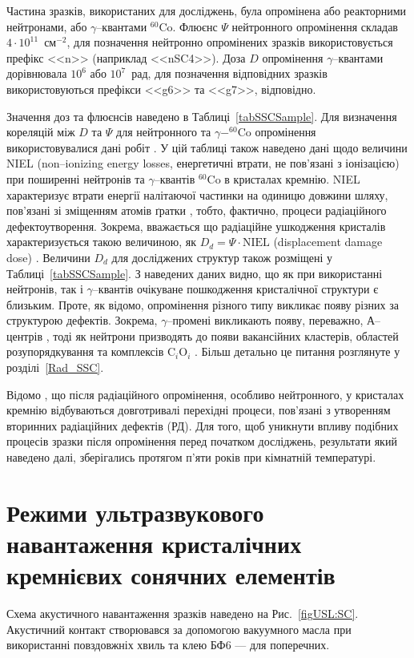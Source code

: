 Частина зразків, використаних для досліджень, була опромінена або реакторними нейтронами, або $\gamma$--квантами $^{60}$Co.
Флюєнс $\Psi$ нейтронного опромінення складав $4\cdot10^{11}$~см$^{-2}$,
для позначення нейтронно опромінених зразків використовується префікс <<n>> (наприклад <<nSC4>>).
Доза $D$ опромінення $\gamma$--квантами дорівнювала $10^6$ або $10^7$~рад, для позначення відповідних зразків використовуються префікси <<g6>> та <<g7>>, відповідно.

Значення доз та флюєнсів наведено в Таблиці~\ref{tabSSCSample}.
Для визначення кореляцій між $D$ та $\Psi$ для нейтронного та $\gamma-^{60}$Co опромінення використовувалися дані робіт \cite{NIEL:Akkerman,Brauning}.
У цій таблиці також наведено дані щодо величини NIEL (non--ionizing energy losses, енергетичні втрати, не пов'язані з іонізацією) при поширенні нейтронів та $\gamma$--квантів $^{60}$Co в кристалах кремнію.
NIEL характеризує втрати енергії налітаючої частинки на одиницю довжини шляху, пов'язані зі зміщенням атомів ґратки \cite{NIEL:Huhtinen,NIEL:Messenger}, тобто, фактично, процеси радіаційного дефектоутворення.
Зокрема, вважається що радіаційне ушкодження кристалів характеризується такою величиною, як $D_d=\Psi\cdot \mbox{NIEL}$ (displacement damage dose) \cite{NIEL:Messenger}.
Величини $D_d$ для досліджених структур також розміщені у Таблиці~\ref{tabSSCSample}.
З наведених даних видно, що як при використанні нейтронів, так і $\gamma$--квантів очікуване пошкодження кристалічної структури є близьким.
Проте, як відомо,  опромінення різного типу викликає появу різних за структурою дефектів.
Зокрема, $\gamma$--промені викликають появу, переважно, А--центрів \cite{NIEL:Jafari,Gamma:Prabhakara,NIEL:Moll}, тоді як нейтрони призводять до появи вакансійних кластерів\cite{Rew:Srour,Junkes}, областей розупорядкування  \cite{Neutron:Arutyunov} та комплексів C$_i$O$_i$ \cite{NIEL:Moll,neutron:Londos}.
Більш детально це питання розглянуте у розділі~\ref{Rad_SSC}.

Відомо \cite{RadBook}, що після радіаційного опромінення, особливо нейтронного, \cite{NIEL:Moll,Rew:Srour} у кристалах кремнію відбуваються довготривалі перехідні процеси, пов'язані з утворенням вторинних радіаційних дефектів (РД).
Для того, щоб уникнути впливу подібних процесів зразки після опромінення перед початком досліджень, результати який наведено далі, зберігались протягом п'яти років при кімнатній температурі.




\section{Режими ультразвукового навантаження кристалічних кремнієвих сонячних елементів\label{SC:USL}}
Схема акустичного навантаження зразків наведено на Рис.~\ref{figUSL:SC}.
Акустичний контакт створювався за допомогою вакуумного масла при використанні повздовжніх хвиль та клею БФ6 --- для поперечних.

